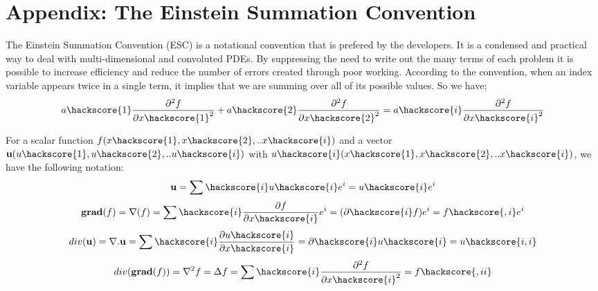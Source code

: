 
%
%
%

\chapter{Appendix: The Einstein Summation Convention}

The Einstein Summation Convention (ESC) is a notational convention that is prefered by the \esc developers. It is a condensed and practical way to deal with multi-dimensional and convoluted PDEs. By suppressing the need to write out the many terms of each problem it is possible to increase efficiency and reduce the number of errors created through poor working. According to the convention, when an index variable appears twice in a single term, it implies that we are summing over all of its possible values.
So we have;
\begin{equation}
a\hackscore{1}\frac{\partial^2 f}{\partial x\hackscore{1}^2} + a\hackscore{2}\frac{\partial^2 f}{\partial x\hackscore{2}^2} = a\hackscore{i}\frac{\partial^2 f}{\partial x\hackscore{i}^2}
\end{equation}

For a scalar function $f(x\hackscore{1},x\hackscore{2},..x\hackscore{i})$ and a vector $\mathbf{u}(u\hackscore{1},u\hackscore{2},..u\hackscore{i})$ with $u\hackscore{i}(x\hackscore{1},x\hackscore{2},..x\hackscore{i})$, we have the following notation:
\begin{equation}
\mathbf{u}=\sum\hackscore{i}u\hackscore{i}e^i = u\hackscore{i}e^i
\end{equation}
\begin{equation}
\mathbf{grad}(f) = \mathbf{\nabla}(f) = \sum\hackscore{i}\frac{\partial f}{\partial x\hackscore{i}}e^i = (\partial\hackscore{i} f)e^i = f\hackscore{,i}e^i
\end{equation}
\begin{equation}
div(\mathbf{u}) = \mathbf{\nabla}.\mathbf{u} = \sum\hackscore{i}\frac{\partial u\hackscore{i}}{\partial x\hackscore{i}} = \partial\hackscore{i} u\hackscore{i} = u\hackscore{i,i}
\end{equation}
\begin{equation}
div(\mathbf{grad}(f)) = \nabla^2 f = \Delta f = \sum\hackscore{i}\frac{\partial^2 f}{\partial x\hackscore{i}^2} = f\hackscore{,ii}
\end{equation}
